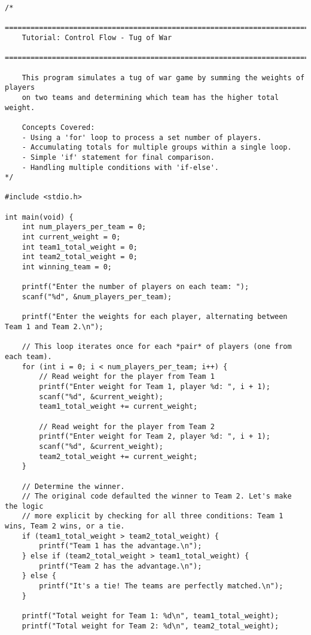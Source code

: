 \documentclass[11pt]{book}
\begin{document}
\begin{verbatim}
/*
    ================================================================================
    Tutorial: Control Flow - Tug of War
    ================================================================================

    This program simulates a tug of war game by summing the weights of players
    on two teams and determining which team has the higher total weight.

    Concepts Covered:
    - Using a 'for' loop to process a set number of players.
    - Accumulating totals for multiple groups within a single loop.
    - Simple 'if' statement for final comparison.
    - Handling multiple conditions with 'if-else'.
*/

#include <stdio.h>

int main(void) {
    int num_players_per_team = 0;
    int current_weight = 0;
    int team1_total_weight = 0;
    int team2_total_weight = 0;
    int winning_team = 0;

    printf("Enter the number of players on each team: ");
    scanf("%d", &num_players_per_team);

    printf("Enter the weights for each player, alternating between Team 1 and Team 2.\n");

    // This loop iterates once for each *pair* of players (one from each team).
    for (int i = 0; i < num_players_per_team; i++) {
        // Read weight for the player from Team 1
        printf("Enter weight for Team 1, player %d: ", i + 1);
        scanf("%d", &current_weight);
        team1_total_weight += current_weight;

        // Read weight for the player from Team 2
        printf("Enter weight for Team 2, player %d: ", i + 1);
        scanf("%d", &current_weight);
        team2_total_weight += current_weight;
    }

    // Determine the winner.
    // The original code defaulted the winner to Team 2. Let's make the logic
    // more explicit by checking for all three conditions: Team 1 wins, Team 2 wins, or a tie.
    if (team1_total_weight > team2_total_weight) {
        printf("Team 1 has the advantage.\n");
    } else if (team2_total_weight > team1_total_weight) {
        printf("Team 2 has the advantage.\n");
    } else {
        printf("It's a tie! The teams are perfectly matched.\n");
    }

    printf("Total weight for Team 1: %d\n", team1_total_weight);
    printf("Total weight for Team 2: %d\n", team2_total_weight);


\end{verbatim}
\end{document}
